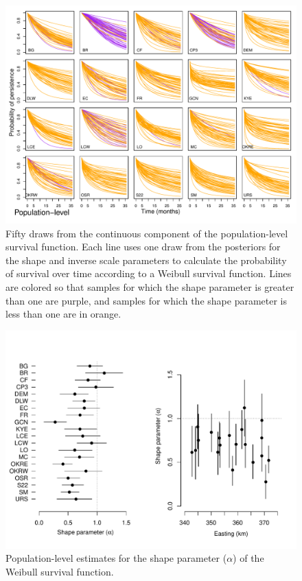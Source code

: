 \documentclass[12pt, oneside]{article}   	%
\begin{document}
 \begin{figure}[!h]
   \centering
       \includegraphics[page=1,width=1\textwidth]{../../figures/survival-function-population.pdf}  
    \caption{ Fifty draws from the continuous component of the population-level survival function. Each line uses one draw from the posteriors for the shape and inverse scale parameters to calculate the probability of survival  over time according to a Weibull survival function. Lines are colored so that samples for which the shape parameter is greater than one are purple, and samples for which the shape parameter is less than one are in orange.    }
 \label{fig:viability-estimates-population}
\end{figure}

 \begin{figure}[!h]
   \centering
       \includegraphics[page=1,width=1\textwidth]{../../figures/survival-function-parms-population.pdf}  
    \caption{ Population-level estimates for the shape parameter ($\alpha$) of the Weibull survival function. }
 \label{fig:viability-estimates-population}
\end{figure}
\end{document}
